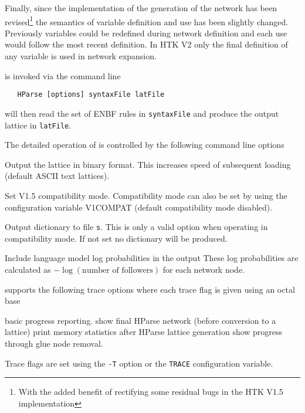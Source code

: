 Finally, since the implementation of the generation of
the  network has been revised\footnote{With the added benefit
of rectifying some residual bugs in the HTK V1.5 implementation}
the semantics of variable definition and use has been slightly changed. 
Previously variables could be redefined during network definition
and each use would follow the most recent definition. In HTK V2 only
the final definition of any variable is used in network expansion.


 is invoked via the command line
\begin{verbatim}
   HParse [options] syntaxFile latFile
\end{verbatim}
 will then read the set of ENBF rules 
in \texttt{syntaxFile} and produce the output lattice in \texttt{latFile}.

The detailed operation of  is controlled by the following
command line options
\begin{optlist}
   Output the lattice in binary format. This increases
              speed of subsequent loading (default ASCII text lattices).

   Set V1.5 compatibility mode. Compatibility mode can also
              be set by using the configuration variable V1COMPAT
              (default compatibility mode disabled).

   Output dictionary to file {\tt s}. This is only
                a valid option when operating in compatibility mode.
                If not set no dictionary will be produced.

   Include language model log probabilities in the output
              These  log probabilities are calculated as 
              $-\log (\mbox{number of followers})$ for each network node.
\end{optlist}


 supports the following trace options where each
trace flag is given using an octal base
\begin{optlist}
    basic progress reporting.
    show final HParse network (before conversion to a lattice)
    print memory statistics after HParse lattice generation
    show progress through glue node removal.
\end{optlist}
Trace flags are set using the \texttt{-T} option or the  \texttt{TRACE} 
configuration variable.


